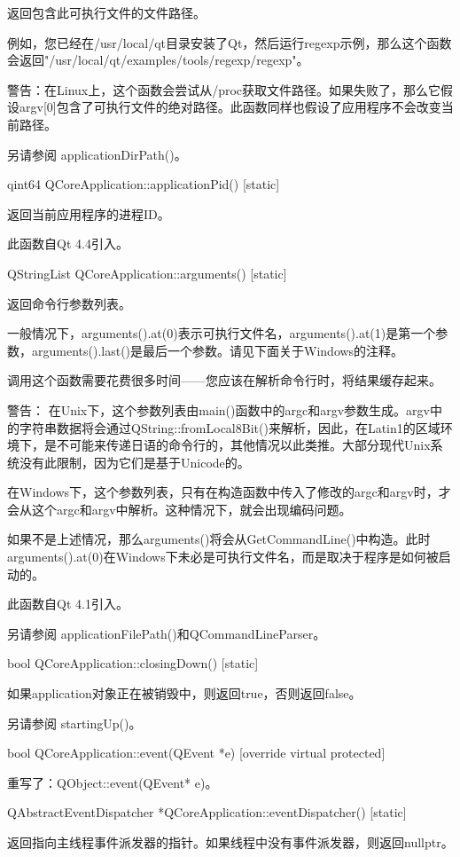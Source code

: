 返回包含此可执行文件的文件路径。

例如，您已经在/usr/local/qt目录安装了Qt，然后运行regexp示例，那么这个函数会返回"/usr/local/qt/examples/tools/regexp/regexp"。

警告：在Linux上，这个函数会尝试从/proc获取文件路径。如果失败了，那么它假设argv[0]包含了可执行文件的绝对路径。此函数同样也假设了应用程序不会改变当前路径。

另请参阅 applicationDirPath()。

qint64 QCoreApplication::applicationPid() [static]

返回当前应用程序的进程ID。

此函数自Qt 4.4引入。

QStringList QCoreApplication::arguments() [static]

返回命令行参数列表。

一般情况下，arguments().at(0)表示可执行文件名，arguments().at(1)是第一个参数，arguments().last()是最后一个参数。请见下面关于Windows的注释。

调用这个函数需要花费很多时间——您应该在解析命令行时，将结果缓存起来。

警告： 在Unix下，这个参数列表由main()函数中的argc和argv参数生成。argv中的字符串数据将会通过QString::fromLocal8Bit()来解析，因此，在Latin1的区域环境下，是不可能来传递日语的命令行的，其他情况以此类推。大部分现代Unix系统没有此限制，因为它们是基于Unicode的。

在Windows下，这个参数列表，只有在构造函数中传入了修改的argc和argv时，才会从这个argc和argv中解析。这种情况下，就会出现编码问题。

如果不是上述情况，那么arguments()将会从GetCommandLine()中构造。此时arguments().at(0)在Windows下未必是可执行文件名，而是取决于程序是如何被启动的。

此函数自Qt 4.1引入。

另请参阅 applicationFilePath()和QCommandLineParser。

bool QCoreApplication::closingDown() [static]

如果application对象正在被销毁中，则返回true，否则返回false。

另请参阅 startingUp()。

bool QCoreApplication::event(QEvent *e) [override virtual protected]

重写了：QObject::event(QEvent* e)。

QAbstractEventDispatcher *QCoreApplication::eventDispatcher() [static]

返回指向主线程事件派发器的指针。如果线程中没有事件派发器，则返回nullptr。

